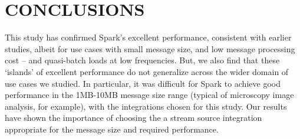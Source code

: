 \documentclass[conference]{IEEEtran}
\begin{document}
\section{CONCLUSIONS}\label{conc}
This study has confirmed Spark's excellent performance, consistent with earlier studies, albeit for use cases with small message size, and low message processing cost -- and quasi-batch loads at low frequencies. But, we also find that these `islands' of excellent performance do not generalize across the wider domain of use cases we studied. In particular, it was difficult for Spark to achieve good performance in the 1MB-10MB message size range (typical of microscopy image analysis, for example), with the integrations chosen for this study. %
Our results have shown the importance of choosing the a stream source integration appropriate for the message size and required performance.
\end{document}

